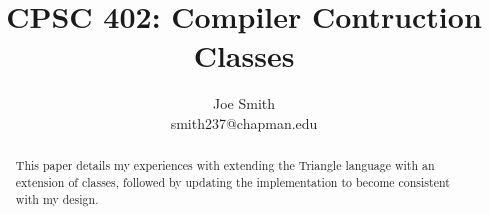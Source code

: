 \documentclass[10pt,letterpaper]{article}
\author{Joe Smith\\smith237@chapman.edu}
\title{\textbf{CPSC 402: Compiler Contruction\\Classes}}
\begin{document}
\maketitle
\begin{abstract}
This paper details my experiences with extending the Triangle language with an extension of classes, followed by updating the implementation to become consistent with my design. 
\end{abstract}

%
\end{document}
